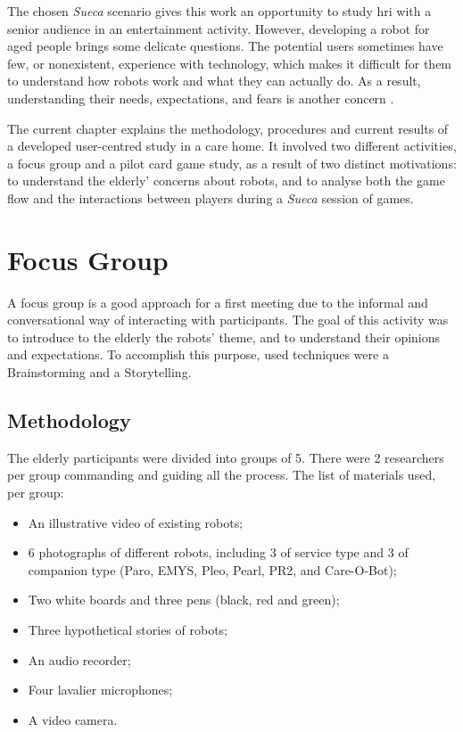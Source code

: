 \label{chapter:user-studies}

The chosen \emph{Sueca} scenario gives this work an opportunity to study \ac{hri} with a senior audience in an entertainment activity.
However, developing a robot for aged people brings some delicate questions.
The potential users sometimes have few, or nonexistent, experience with technology, which makes it difficult for them to understand how robots work and what they can actually do.
As a result, understanding their needs, expectations, and fears is another concern \cite{Oliveira}.


The current chapter explains the methodology, procedures and current results of a developed user-centred study in a care home.
It involved two different activities, a focus group and a pilot card game study, as a result of two distinct motivations: to understand the elderly' concerns about robots, and to analyse both the game flow and the interactions between players during a \emph{Sueca} session of games.


\section{Focus Group}

A focus group is a good approach for a first meeting due to the informal and conversational way of interacting with participants.
The goal of this activity was to introduce to the elderly the robots' theme, and to understand their opinions and expectations.
To accomplish this purpose, used techniques were a Brainstorming and a Storytelling.

\subsection{Methodology}
The elderly participants were divided into groups of 5.
There were 2 researchers per group commanding and guiding all the process.
The list of materials used, per group:

\begin{itemize}
\item An illustrative video of existing robots;
\item 6 photographs of different robots, including 3 of service type and 3 of companion type (Paro, EMYS, Pleo, Pearl, PR2, and Care-O-Bot);
\item Two white boards and three pens (black, red and green);
\item Three hypothetical stories of robots;
\item An audio recorder;
\item Four lavalier microphones;
\item A video camera.
\end{itemize}


